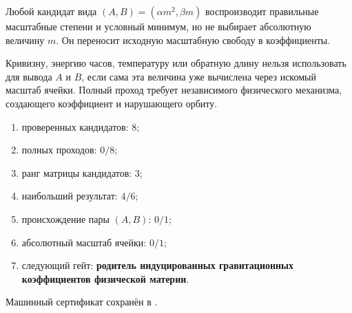 \begin{theorem}
Любой кандидат вида $(A,B)=(\alpha m^2,\beta m)$ воспроизводит правильные
масштабные степени и условный минимум, но не выбирает абсолютную величину
$m$. Он переносит исходную масштабную свободу в коэффициенты.
\end{theorem}

\begin{nogocriterion}
Кривизну, энергию часов, температуру или обратную длину нельзя использовать
для вывода $A$ и $B$, если сама эта величина уже вычислена через искомый
масштаб ячейки. Полный проход требует независимого физического механизма,
создающего коэффициент и нарушающего орбиту.
\end{nogocriterion}

\begin{protocol}\begin{enumerate}
\item проверенных кандидатов: \textbf{$8$};
\item полных проходов: \textbf{$0/8$};
\item ранг матрицы кандидатов: \textbf{$3$};
\item наибольший результат: \textbf{$4/6$};
\item происхождение пары $(A,B)$: \textbf{$0/1$};
\item абсолютный масштаб ячейки: \textbf{$0/1$};
\item следующий гейт: \textbf{родитель индуцированных гравитационных коэффициентов физической материи}.
\end{enumerate}\end{protocol}

Машинный сертификат сохранён в
.